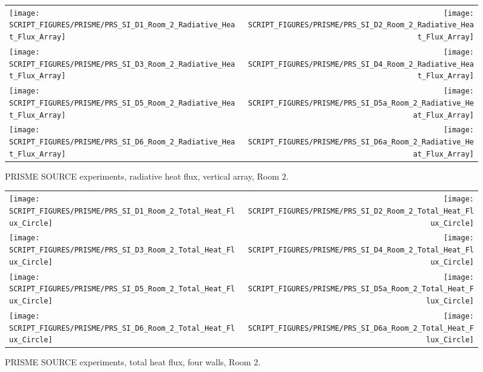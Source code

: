 \begin{figure}[p]
\begin{tabular*}{\textwidth}{l@{\extracolsep{\fill}}r}
\texttt{[image: SCRIPT\_FIGURES/PRISME/PRS\_SI\_D1\_Room\_2\_Radiative\_Heat\_Flux\_Array]} &
\texttt{[image: SCRIPT\_FIGURES/PRISME/PRS\_SI\_D2\_Room\_2\_Radiative\_Heat\_Flux\_Array]} \\
\texttt{[image: SCRIPT\_FIGURES/PRISME/PRS\_SI\_D3\_Room\_2\_Radiative\_Heat\_Flux\_Array]} &
\texttt{[image: SCRIPT\_FIGURES/PRISME/PRS\_SI\_D4\_Room\_2\_Radiative\_Heat\_Flux\_Array]} \\
\texttt{[image: SCRIPT\_FIGURES/PRISME/PRS\_SI\_D5\_Room\_2\_Radiative\_Heat\_Flux\_Array]} &
\texttt{[image: SCRIPT\_FIGURES/PRISME/PRS\_SI\_D5a\_Room\_2\_Radiative\_Heat\_Flux\_Array]} \\
\texttt{[image: SCRIPT\_FIGURES/PRISME/PRS\_SI\_D6\_Room\_2\_Radiative\_Heat\_Flux\_Array]} &
\texttt{[image: SCRIPT\_FIGURES/PRISME/PRS\_SI\_D6a\_Room\_2\_Radiative\_Heat\_Flux\_Array]}
\end{tabular*}
\caption[PRISME SOURCE experiments, radiative heat flux, vertical array, Room 2]{PRISME SOURCE experiments, radiative heat flux, vertical array, Room 2.}
\label{PRISME_SOURCE_Wall_Array_RHF_Room_2}
\end{figure}

\begin{figure}[p]
\begin{tabular*}{\textwidth}{l@{\extracolsep{\fill}}r}
\texttt{[image: SCRIPT\_FIGURES/PRISME/PRS\_SI\_D1\_Room\_2\_Total\_Heat\_Flux\_Circle]} &
\texttt{[image: SCRIPT\_FIGURES/PRISME/PRS\_SI\_D2\_Room\_2\_Total\_Heat\_Flux\_Circle]} \\
\texttt{[image: SCRIPT\_FIGURES/PRISME/PRS\_SI\_D3\_Room\_2\_Total\_Heat\_Flux\_Circle]} &
\texttt{[image: SCRIPT\_FIGURES/PRISME/PRS\_SI\_D4\_Room\_2\_Total\_Heat\_Flux\_Circle]} \\
\texttt{[image: SCRIPT\_FIGURES/PRISME/PRS\_SI\_D5\_Room\_2\_Total\_Heat\_Flux\_Circle]} &
\texttt{[image: SCRIPT\_FIGURES/PRISME/PRS\_SI\_D5a\_Room\_2\_Total\_Heat\_Flux\_Circle]} \\
\texttt{[image: SCRIPT\_FIGURES/PRISME/PRS\_SI\_D6\_Room\_2\_Total\_Heat\_Flux\_Circle]} &
\texttt{[image: SCRIPT\_FIGURES/PRISME/PRS\_SI\_D6a\_Room\_2\_Total\_Heat\_Flux\_Circle]}
\end{tabular*}
\caption[PRISME SOURCE experiments, total heat flux, four walls, Room 2]{PRISME SOURCE experiments, total heat flux, four walls, Room 2.}
\label{PRISME_SOURCE_Wall_Circle_THF_Room_2}
\end{figure}

